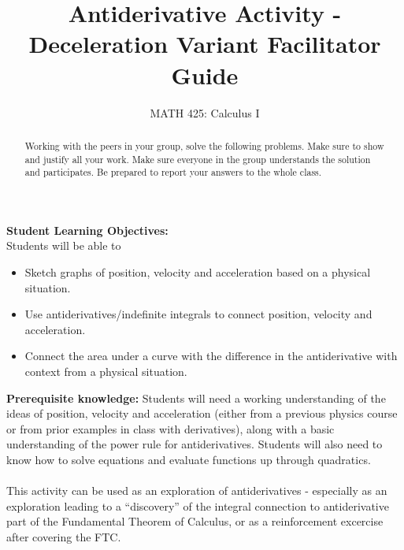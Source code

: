 \documentclass{ximera}
\title{Antiderivative Activity - Deceleration Variant Facilitator Guide}
\author{MATH 425: Calculus I}
\begin{document}
\begin{abstract}
    Working with the peers in your group, solve the following problems. Make sure to show and justify all your work. Make sure everyone in the group understands the solution and participates. Be prepared to report your answers to the whole class. 
\end{abstract}
\maketitle

\textbf{Student Learning Objectives:}\\
Students will be able to 
\begin{itemize}
    \item Sketch graphs of position, velocity and acceleration based on a physical situation.
    \item Use antiderivatives/indefinite integrals to connect position, velocity and acceleration.
    \item Connect the area under a curve with the difference in the antiderivative with context from a physical situation.
\end{itemize}
\textbf{Prerequisite knowledge:} Students will need a working understanding of the ideas of position, velocity and acceleration (either from a previous physics course or from prior examples in class with derivatives), along with a basic understanding of the power rule for antiderivatives.  Students will also need to know how to solve equations and evaluate functions up through quadratics. \\
\\
This activity can be used as an exploration of antiderivatives - especially as an exploration leading to a ``discovery'' of the integral connection to antiderivative part of the Fundamental Theorem of Calculus, or as a reinforcement excercise after covering the FTC.
\end{document}
